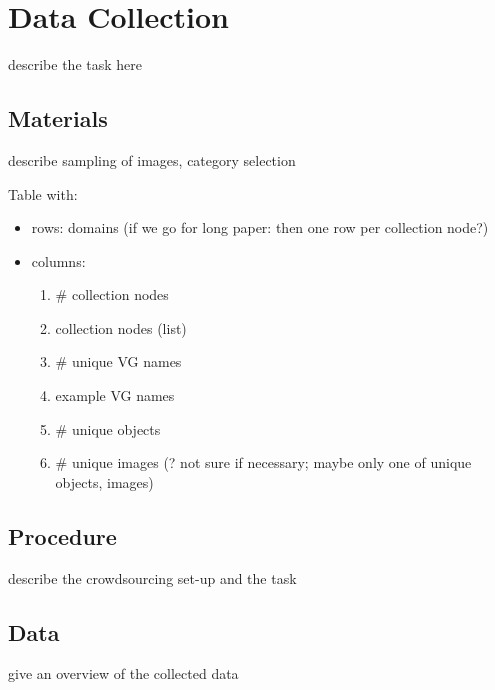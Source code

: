 \section{Data Collection}
\label{sec:task}


describe the task here

\subsection{Materials} describe sampling of images, category selection

Table with:

\begin{itemize}
\item rows: domains (if we go for long paper: then one row per collection node?)
\item columns:
  \begin{enumerate}
  \item \# collection nodes
  \item collection nodes (list)
  \item \# unique VG names
  \item example VG names
  \item \# unique objects
  \item \# unique images (? not sure if necessary; maybe only one of unique {objects, images})
  \end{enumerate}
\end{itemize}

\subsection{Procedure} describe the crowdsourcing set-up and the task

\subsection{Data} give an overview of the collected data

